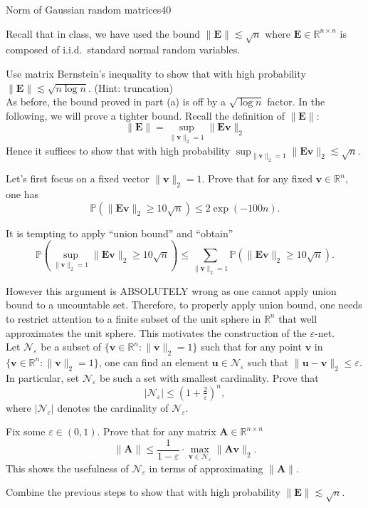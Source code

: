 \documentclass{article}
\begin{document}
\begin{problem}{Norm of Gaussian random matrices}{40}

Recall that in class, we have used the bound $\| \bm{E} \| \lesssim \sqrt{n}$ where $\bm{E} \in \mathbb{R}^{n \times n}$ is composed of i.i.d.~standard normal random variables. 

 Use matrix Bernstein's inequality to show that with high probability $\|\bm{E}\| \lesssim \sqrt{n \log n}$. (Hint: truncation) \\

As before, the bound proved in part (a) is off by a $\sqrt{\log n}$ factor. In the following, we will prove a tighter bound. Recall the definition of $\|\bm{E}\|$:
\[
\|\bm{E}\| = \sup_{\| \bm{v}\|_2 =1} \|\bm{E} \bm{v} \|_2
\]
Hence it suffices to show that with high probability $\sup_{\| \bm{v}\|_2 =1} \|\bm{E} \bm{v} \|_2 \lesssim \sqrt{n}$.


Let's first focus on a fixed vector $\| \bm{v}\|_2 =1 $. Prove that for any fixed $\bm{v} \in \mathbb{R}^{n}$, one has 
\[
\mathbb{P}( \|\bm{E} \bm{v} \|_2 \geq 10\sqrt{n}) \leq 2 \exp(-100n).
\] 

It is tempting to apply ``union bound'' and ``obtain''
\[
\mathbb{P}( \sup_{\| \bm{v}\|_2 =1} \|\bm{E} \bm{v} \|_2 \geq 10\sqrt{n}) \leq \sum_{\| \bm{v}\|_2 =1} \mathbb{P}( \|\bm{E} \bm{v} \|_2 \geq 10\sqrt{n}).
\]

However this argument is ABSOLUTELY wrong as one cannot apply union bound to a uncountable set. Therefore, to properly apply union bound, one needs to restrict attention to a finite subset of the unit sphere in $\mathbb{R}^{n}$ that well approximates the unit sphere. This motivates the construction of the $\varepsilon$-net. \\

 Let $\mathcal{N}_{\varepsilon}$ be a subset of $\{\bm{v} \in \mathbb{R}^{n}: \| \bm{v}\|_2 =1\}$ such that for any point $\bm{v}$ in $\{\bm{v} \in \mathbb{R}^{n}: \| \bm{v}\|_2 =1\}$, one can find an element $\bm{u} \in \mathcal{N}_{\varepsilon}$ such that $\|\bm{u} - \bm{v}\|_{2} \leq \varepsilon$. In particular, set $\mathcal{N}_{\varepsilon}$ be such a set with smallest cardinality. Prove that 
\[
|\mathcal{N}_{\varepsilon}| \leq (1 + \tfrac{2}{\varepsilon})^{n},
\]
where $|\mathcal{N}_{\varepsilon}|$ denotes the cardinality of $\mathcal{N}_{\varepsilon}$.

Fix some $\varepsilon \in (0,1)$. Prove that for any matrix $\bm{A} \in \mathbb{R}^{n \times n}$
\[
\| \bm{A} \| \leq \frac{1}{ 1 - \varepsilon } \cdot \max_{\bm{v} \in \mathcal{N}_{\varepsilon} }\|\bm{A} \bm{v}\|_{2}.
\] 
This shows the usefulness of $\mathcal{N}_{\varepsilon}$ in terms of approximating $\|\bm{A}\|$.

 Combine the previous steps to show that with high probability $\|\bm{E}\| \lesssim \sqrt{n}$.
\end{problem}
\end{document}
